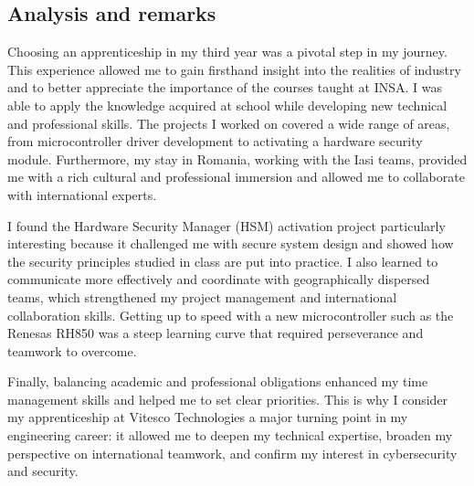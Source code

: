 \subsection{Analysis and remarks}
\indent \indent Choosing an apprenticeship in my third year was a pivotal step in my journey. This experience allowed me to gain firsthand insight into the realities of industry and to better appreciate the importance of the courses taught at INSA. I was able to apply the knowledge acquired at school while developing new technical and professional skills. The projects I worked on covered a wide range of areas, from microcontroller driver development to activating a hardware security module. Furthermore, my stay in Romania, working with the Iasi teams, provided me with a rich cultural and professional immersion and allowed me to collaborate with international experts.
\vspace{0.25cm}

\noindent I found the Hardware Security Manager (HSM) activation project particularly interesting because it challenged me with secure system design and showed how the security principles studied in class are put into practice. I also learned to communicate more effectively and coordinate with geographically dispersed teams, which strengthened my project management and international collaboration skills. Getting up to speed with a new microcontroller such as the Renesas RH850 was a steep learning curve that required perseverance and teamwork to overcome.
\vspace{0.25cm}

\noindent Finally, balancing academic and professional obligations enhanced my time management skills and helped me to set clear priorities. This is why I consider my apprenticeship at Vitesco Technologies a major turning point in my engineering career: it allowed me to deepen my technical expertise, broaden my perspective on international teamwork, and confirm my interest in cybersecurity and security.
